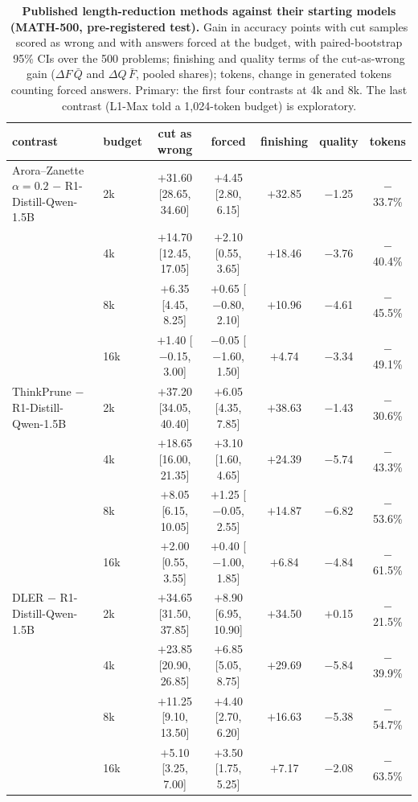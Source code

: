 \documentclass[10pt]{article}
\begin{document}
\begin{table}[h]
\centering\footnotesize
\caption{\textbf{Published length-reduction methods against their starting models (MATH-500, pre-registered test).} Gain in accuracy points with cut samples scored as wrong and with answers forced at the budget, with paired-bootstrap 95\% CIs over the 500 problems; finishing and quality terms of the cut-as-wrong gain ($\Delta F\,\bar Q$ and $\Delta Q\,\bar F$, pooled shares); tokens, change in generated tokens counting forced answers. Primary: the first four contrasts at 4k and 8k. The last contrast (L1-Max told a 1{,}024-token budget) is exploratory.}
\label{tab:ext}
\setlength{\tabcolsep}{3.5pt}
\begin{tabular}{llccccc}
\toprule
contrast & budget & cut as wrong & forced & finishing & quality & tokens \\
\midrule
Arora--Zanette $\alpha{=}0.2$ $-$ R1-Distill-Qwen-1.5B & 2k & $+$31.60 [28.65, 34.60] & $+$4.45 [2.80, 6.15] & $+$32.85 & $-$1.25 & $-$33.7\% \\
 & 4k & $+$14.70 [12.45, 17.05] & $+$2.10 [0.55, 3.65] & $+$18.46 & $-$3.76 & $-$40.4\% \\
 & 8k & $+$6.35 [4.45, 8.25] & $+$0.65 [$-$0.80, 2.10] & $+$10.96 & $-$4.61 & $-$45.5\% \\
 & 16k & $+$1.40 [$-$0.15, 3.00] & $-$0.05 [$-$1.60, 1.50] & $+$4.74 & $-$3.34 & $-$49.1\% \\
\addlinespace
ThinkPrune $-$ R1-Distill-Qwen-1.5B & 2k & $+$37.20 [34.05, 40.40] & $+$6.05 [4.35, 7.85] & $+$38.63 & $-$1.43 & $-$30.6\% \\
 & 4k & $+$18.65 [16.00, 21.35] & $+$3.10 [1.60, 4.65] & $+$24.39 & $-$5.74 & $-$43.3\% \\
 & 8k & $+$8.05 [6.15, 10.05] & $+$1.25 [$-$0.05, 2.55] & $+$14.87 & $-$6.82 & $-$53.6\% \\
 & 16k & $+$2.00 [0.55, 3.55] & $+$0.40 [$-$1.00, 1.85] & $+$6.84 & $-$4.84 & $-$61.5\% \\
\addlinespace
DLER $-$ R1-Distill-Qwen-1.5B & 2k & $+$34.65 [31.50, 37.85] & $+$8.90 [6.95, 10.90] & $+$34.50 & $+$0.15 & $-$21.5\% \\
 & 4k & $+$23.85 [20.90, 26.85] & $+$6.85 [5.05, 8.75] & $+$29.69 & $-$5.84 & $-$39.9\% \\
 & 8k & $+$11.25 [9.10, 13.50] & $+$4.40 [2.70, 6.20] & $+$16.63 & $-$5.38 & $-$54.7\% \\
 & 16k & $+$5.10 [3.25, 7.00] & $+$3.50 [1.75, 5.25] & $+$7.17 & $-$2.08 & $-$63.5\% \\

\end{tabular}
\end{table}
\end{document}
